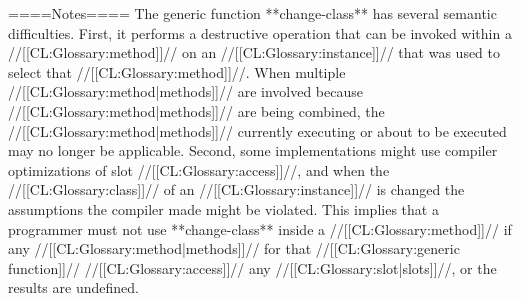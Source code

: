 ====Notes====
The generic function **change-class** has several semantic difficulties. First, it performs a destructive operation that can be invoked within a //[[CL:Glossary:method]]// on an //[[CL:Glossary:instance]]// that was used to select that //[[CL:Glossary:method]]//. When multiple //[[CL:Glossary:method|methods]]// are involved because //[[CL:Glossary:method|methods]]// are being combined, the //[[CL:Glossary:method|methods]]// currently executing or about to be executed may no longer be applicable. Second, some implementations might use compiler optimizations of slot //[[CL:Glossary:access]]//, and when the //[[CL:Glossary:class]]// of an //[[CL:Glossary:instance]]// is changed the assumptions the compiler made might be violated. This implies that a programmer must not use **change-class** inside a //[[CL:Glossary:method]]// if any //[[CL:Glossary:method|methods]]// for that //[[CL:Glossary:generic function]]// //[[CL:Glossary:access]]// any //[[CL:Glossary:slot|slots]]//, or the results are undefined.

    
